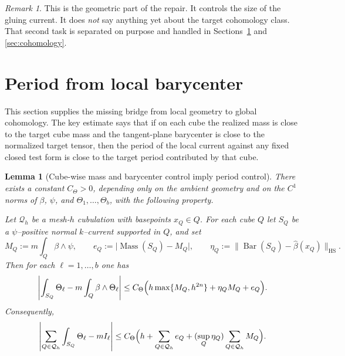 \documentclass[11pt]{article}
\numberwithin{equation}{section}
\theoremstyle{plain}
\newtheorem{lemma}[theorem]{Lemma}
\theoremstyle{definition}
\theoremstyle{remark}
\newtheorem{remark}[theorem]{Remark}
\DeclareMathOperator{\Mass}{Mass}
\DeclareMathOperator{\HS}{HS}
\newcommand{\calQ}{\mathcal{Q}}
\newcommand{\Bary}{\operatorname{Bar}}
\begin{document}
\begin{remark}
This is the geometric part of the repair.  It controls the size of the gluing current.  It does \emph{not} say anything yet about the target cohomology class.  That second task is separated on purpose and handled in Sections~\ref{sec:periods} and \ref{sec:cohomology}.
\end{remark}

\section{Period from local barycenter}\label{sec:periods}

This section supplies the missing bridge from local geometry to global cohomology.  The key estimate says that if on each cube the realized mass is close to the target cube mass and the tangent-plane barycenter is close to the normalized target tensor, then the period of the local current against any fixed closed test form is close to the target period contributed by that cube.

\begin{lemma}[Cube-wise mass and barycenter control imply period control]\label{lem:period-control}
There exists a constant $C_\Theta>0$, depending only on the ambient geometry and on the $C^1$ norms of $\beta$, $\psi$, and $\Theta_1,\dots,\Theta_b$, with the following property.

Let $\calQ_h$ be a mesh-$h$ cubulation with basepoints $x_Q\in Q$.  For each cube $Q$ let $S_Q$ be a $\psi$--positive normal $k$--current supported in $Q$, and set
\[
M_Q:=m\int_Q \beta\wedge\psi,
\qquad
e_Q:=\bigl|\Mass(S_Q)-M_Q\bigr|,
\qquad
\eta_Q:=\bigl\|\Bary(S_Q)-\widehat\beta(x_Q)\bigr\|_{\HS}.
\]
Then for each $\ell=1,\dots,b$ one has
\[
\left|\int_{S_Q}\Theta_\ell - m\int_Q \beta\wedge\Theta_\ell\right|
\le
C_\Theta\Bigl(h\max\{M_Q,h^{2n}\}+\eta_Q M_Q+e_Q\Bigr).
\]
Consequently,
\[
\left|\sum_{Q\in\calQ_h}\int_{S_Q}\Theta_\ell - mI_\ell\right|
\le
C_\Theta\Bigl(h+\sum_{Q\in\calQ_h} e_Q + (\sup_Q \eta_Q)\sum_{Q\in\calQ_h} M_Q\Bigr).
\]
\end{lemma}
\end{document}
